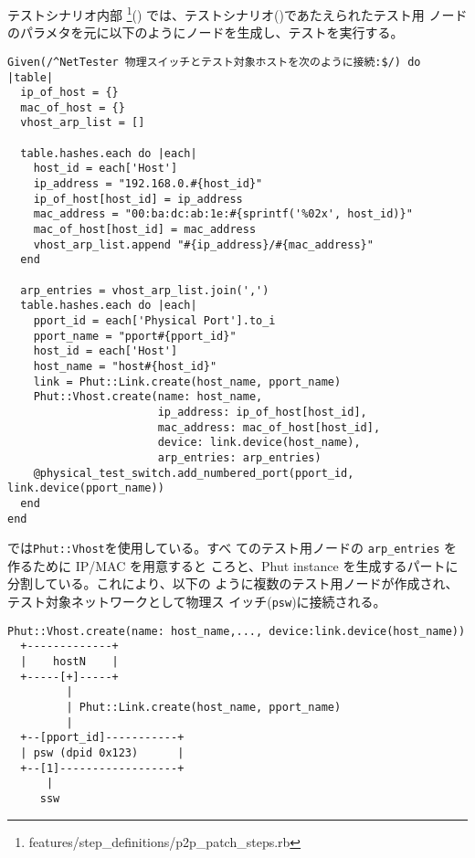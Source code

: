 テストシナリオ内部
\footnote{features/step\_definitions/p2p\_patch\_steps.rb}()
では、テストシナリオ()であたえられたテスト用
ノードのパラメタを元に以下のようにノードを生成し、テストを実行する。

\begin{lstlisting}[caption=テスト用ノードの生成と操作,label=lst:operate-testnode]
Given(/^NetTester 物理スイッチとテスト対象ホストを次のように接続:$/) do |table|
  ip_of_host = {}
  mac_of_host = {}
  vhost_arp_list = []

  table.hashes.each do |each|
    host_id = each['Host']
    ip_address = "192.168.0.#{host_id}"
    ip_of_host[host_id] = ip_address
    mac_address = "00:ba:dc:ab:1e:#{sprintf('%02x', host_id)}"
    mac_of_host[host_id] = mac_address
    vhost_arp_list.append "#{ip_address}/#{mac_address}"
  end

  arp_entries = vhost_arp_list.join(',')
  table.hashes.each do |each|
    pport_id = each['Physical Port'].to_i
    pport_name = "pport#{pport_id}"
    host_id = each['Host']
    host_name = "host#{host_id}"
    link = Phut::Link.create(host_name, pport_name)
    Phut::Vhost.create(name: host_name,
                       ip_address: ip_of_host[host_id],
                       mac_address: mac_of_host[host_id],
                       device: link.device(host_name),
                       arp_entries: arp_entries)
    @physical_test_switch.add_numbered_port(pport_id, link.device(pport_name))
  end
end
\end{lstlisting}

では\verb|Phut::Vhost|を使用している。すべ
てのテスト用ノードの \verb|arp_entries| を作るために IP/MAC を用意すると
ころと、Phut instance を生成するパートに分割している。これにより、以下の
ように複数のテスト用ノードが作成され、テスト対象ネットワークとして物理ス
イッチ(\verb|psw|)に接続される。

\begin{textbox}
\begin{verbatim}
Phut::Vhost.create(name: host_name,..., device:link.device(host_name))
  +-------------+
  |    hostN    |
  +-----[+]-----+
         |
         | Phut::Link.create(host_name, pport_name)
         |
  +--[pport_id]-----------+
  | psw (dpid 0x123)      |
  +--[1]------------------+
      |
     ssw
\end{verbatim}
\end{textbox}

